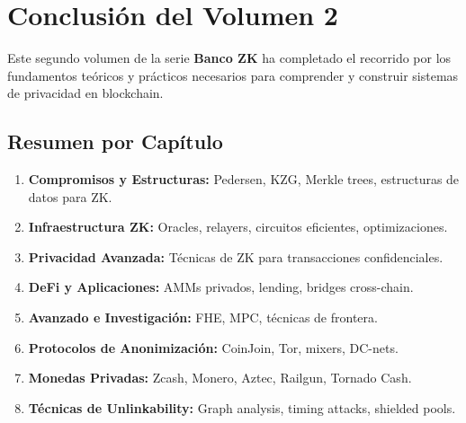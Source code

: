 \documentclass[11pt,a4paper,twoside]{book}
\begin{document}


\chapter*{Conclusi\'on del Volumen 2}

Este segundo volumen de la serie \textbf{Banco ZK} ha completado el recorrido por los fundamentos te\'oricos y pr\'acticos necesarios para comprender y construir sistemas de privacidad en blockchain.

\section*{Resumen por Cap\'itulo}

\begin{enumerate}
    \item \textbf{Compromisos y Estructuras:} Pedersen, KZG, Merkle trees, estructuras de datos para ZK.
    
    \item \textbf{Infraestructura ZK:} Oracles, relayers, circuitos eficientes, optimizaciones.
    
    \item \textbf{Privacidad Avanzada:} T\'ecnicas de ZK para transacciones confidenciales.
    
    \item \textbf{DeFi y Aplicaciones:} AMMs privados, lending, bridges cross-chain.
    
    \item \textbf{Avanzado e Investigaci\'on:} FHE, MPC, t\'ecnicas de frontera.
    
    \item \textbf{Protocolos de Anonimizaci\'on:} CoinJoin, Tor, mixers, DC-nets.
    
    \item \textbf{Monedas Privadas:} Zcash, Monero, Aztec, Railgun, Tornado Cash.
    
    \item \textbf{T\'ecnicas de Unlinkability:} Graph analysis, timing attacks, shielded pools.
\end{enumerate}
\end{document}
